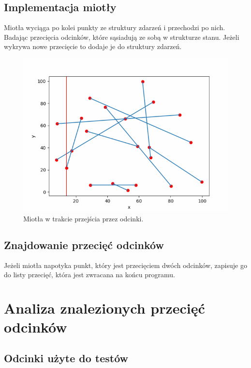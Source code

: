 \documentclass[11pt]{scrartcl}
\begin{document}
    \subsection{Implementacja miotły}
    Miotła wyciąga po kolei punkty ze struktury zdarzeń i przechodzi po nich. Badając
    przecięcia odcinków, które sąsiadują ze sobą w strukturze stanu. Jeżeli wykrywa
    nowe przecięcie to dodaje je do struktury zdarzeń.

    \begin{figure}[H]
        \centering
        \includegraphics[width=0.8\linewidth]{4_1.png}
        \caption{Miotła w trakcie przejścia przez odcinki.}
    \end{figure}

    \subsection{Znajdowanie przecięć odcinków}
    Jeżeli miotła napotyka punkt, który jest przecięciem dwóch odcinków, zapisuje go
    do listy przecięć, która jest zwracana na końcu programu.

    \section{Analiza znalezionych przecięć odcinków}
    \subsection{Odcinki użyte do testów}
\end{document}
